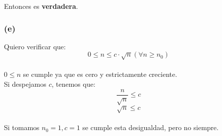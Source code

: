 \documentclass[12 pt]{article}
\begin{document}
            \begin{center}
            \end{center}
            
            Entonces es \textbf{verdadera}.

        \subsubsection*{(e)}
            Quiero verificar que:
            \[0 \leq n \leq c \cdot \sqrt{n} (\forall n \geq n_{0})\]
            \\
            \(0 \leq n\) se cumple ya que es cero y estrictamente creciente.
            \\
            Si despejamos $c$, tenemos que:
            \[\frac{n}{\sqrt{n}} \leq c\]
            \[\sqrt{n} \leq c\]
            \\
            Si tomamos \(n_{0} = 1, c = 1\) se cumple esta desigualdad, pero no siempre.
\end{document}
